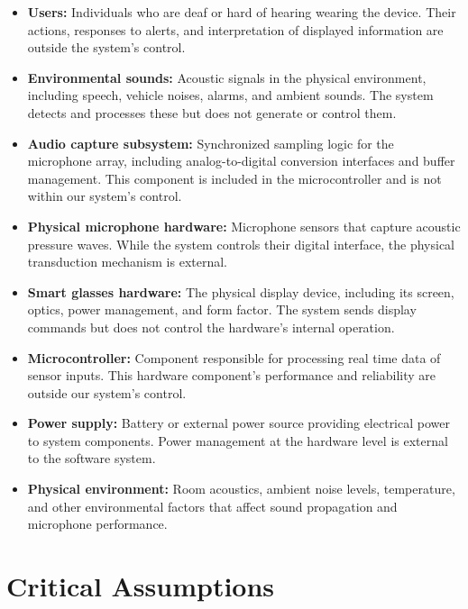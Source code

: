 \documentclass{article}
\begin{document}
\begin{itemize}
\item \textbf{Users:} Individuals who are deaf or hard of hearing wearing
the device. Their actions, responses to alerts, and interpretation of
displayed information are outside the system's control.

\item \textbf{Environmental sounds:} Acoustic signals in the physical
environment, including speech, vehicle noises, alarms, and ambient sounds.
The system detects and processes these but does not generate or control
them.

\item \textbf{Audio capture subsystem:} Synchronized sampling logic for the
microphone array, including analog-to-digital conversion interfaces and
buffer management. This component is included in the microcontroller and is not
within our system's control.

\item \textbf{Physical microphone hardware:} Microphone sensors that capture
acoustic pressure waves. While the system controls their digital interface,
the physical transduction mechanism is external.

\item \textbf{Smart glasses hardware:} The physical display device,
including its screen, optics, power management, and form factor. The system
sends display commands but does not control the hardware's internal
operation.

\item \textbf{Microcontroller:}
\label{comp:microcontroller} Component responsible for processing real time
data of sensor inputs. This hardware component's performance and reliability
are outside our system's control.

\item \textbf{Power supply:} Battery or external power source providing
electrical power to system components. Power management at the hardware
level is external to the software system.

\item \textbf{Physical environment:} Room acoustics, ambient noise levels,
temperature, and other environmental factors that affect sound propagation
and microphone performance.
\end{itemize}



\section{Critical Assumptions}
\end{document}
